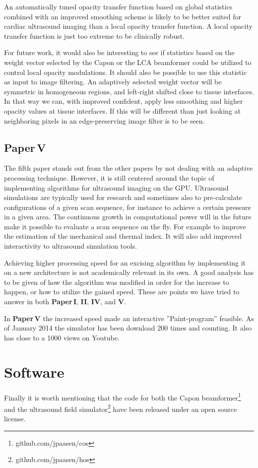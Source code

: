 An automatically tuned opacity transfer function based on global statistics combined with an improved smoothing scheme is likely to be better suited for cardiac ultrasound imaging than a local opacity transfer function. A local opacity transfer function is just too extreme to be clinically robust. 

For future work, it would also be interesting to see if statistics based on the weight vector selected by the Capon or the LCA beamformer could be utilized to control local opacity modulations. It should also be possible to use this statistic as input to image filtering. An adaptively selected weight vector will be symmetric in homogeneous regions, and left-right shifted close to tissue interfaces. In that way we can, with improved confident, apply less smoothing and higher opacity values at tissue interfaces. If this will be different than just looking at neighboring pixels in an edge-preserving image filter is to be seen.

\subsection{Paper\,V}
The fifth paper stands out from the other papers by not dealing with an adaptive processing technique. However, it is still centered around the topic of implementing algorithms for ultrasound imaging on the GPU. Ultrasound simulations are typically used for research and sometimes also to pre-calculate configurations of a given scan sequence, for instance to achieve a certain pressure in a given area. The continuous growth in computational power will in the future make it possible to evaluate a scan sequence on the fly. For example to improve the estimation of the mechanical and thermal index. It will also add improved interactivity to ultrasound simulation tools. 

Achieving higher processing speed for an excising algorithm by implementing it on a new architecture is not academically relevant in its own. A good analysis has to be given of how the algorithm was modified in order for the increase to happen, or how to utilize the gained speed. These are points we have tried to answer in both \textbf{Paper\,I}, \textbf{II},  \textbf{IV}, and \textbf{V}.  

In \textbf{Paper\,V} the increased speed made an interactive ''Paint-program'' feasible. As of January 2014 the simulator has been download 200 times and counting. It also has close to a 1000 views on Youtube. 

\section{Software}
Finally it is worth mentioning that the code for both the Capon beamformer\footnote{github.com/jpaasen/cos} and the ultrasound field simulator\footnote{github.com/jpaasen/hos} have been released under an open source license. 
\endinput